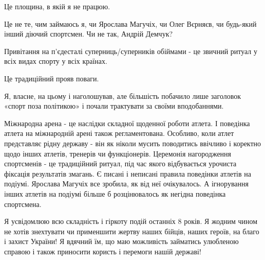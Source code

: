 Це площина, в якій я не працюю.

Це не те, чим займаюсь я, чи Ярослава Магучіх, чи Олег Вєрняєв, чи будь-який
інший діючий спортсмен. Чи не так,  Андрій Демчук?

Привітання на п’єдесталі  суперниць/суперників обіймами - це звичний ритуал у
всіх видах спорту у всіх країнах.

Це традиційний прояв поваги. 

Я, власне, на цьому і наголошував, але більшість побачило лише заголовок «спорт
поза політикою» і почали трактувати за своїми вподобаннями. 

Міжнародна арена - це наслідки складної щоденної роботи атлета. І поведінка
атлета на міжнародній арені також регламентована. Особливо, коли атлет
представляє рідну державу - він як ніколи мусить поводитись ввічливо і коректно
щодо інших атлетів, тренерів чи функціонерів. Церемонія нагородження
спортсменів - це традиційний ритуал, під час якого відбувається урочиста
фіксація результатів змагань. Є писані і неписані правила поведінки атлетів на
подіумі. Ярослава Магучіх все зробила, як від неї очікувалось. А ігнорування
інших атлетів на подіумі більше б розцінювалось як негідна поведінка
спортсмена.

Я усвідомлюю всю складність і гіркоту подій останніх 8 років. Я жодним чином не
хотів знехтувати чи применшити жертву наших бійців, наших героїв, на благо і
захист України! Я вдячний їм, що маю можливість займатись улюбленою справою і
також приносити користь і перемоги нашій державі!
